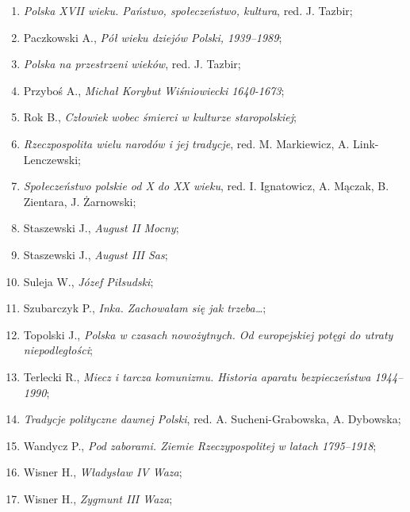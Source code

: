 \documentclass[a4paper,11pt]{article}
\begin{document}
\begin{enumerate}
\item \textit{Polska XVII wieku. Państwo, społeczeństwo, kultura}, red.
  J. Tazbir;

\item Paczkowski A., \textit{Pół wieku dziejów Polski, 1939--1989};

\item \textit{Polska na przestrzeni wieków}, red. J. Tazbir;

\item Przyboś A., \textit{Michał Korybut Wiśniowiecki 1640-1673};

\item Rok B., \textit{Człowiek wobec śmierci w kulturze staropolskiej};

\item \textit{Rzeczpospolita wielu narodów i jej tradycje}, red. M.
  Markiewicz, A. Link-Lenczewski;

\item \textit{Społeczeństwo polskie od X do XX wieku}, red. I.
  Ignatowicz, A. Mączak, B. Zientara, J. Żarnowski;

\item Staszewski J., \textit{August II Mocny};

\item Staszewski J., \textit{August III Sas};

\item Suleja W., \textit{Józef Piłsudski};

\item Szubarczyk P., \textit{Inka. Zachowałam się jak trzeba\ldots};

\item Topolski J., \textit{Polska w czasach nowożytnych. Od europejskiej
    potęgi do utraty niepodległości};

\item Terlecki R., \textit{Miecz i tarcza komunizmu. Historia aparatu
    bezpieczeństwa 1944--1990};

\item \textit{Tradycje polityczne dawnej Polski}, red. A.
  Sucheni-Grabowska, A. Dybowska;

\item Wandycz P., \textit{Pod zaborami. Ziemie Rzeczypospolitej w latach
    1795--1918};

\item Wisner H., \textit{Władysław IV Waza};

\item Wisner H., \textit{Zygmunt III Waza};


\end{enumerate}
\end{document}
